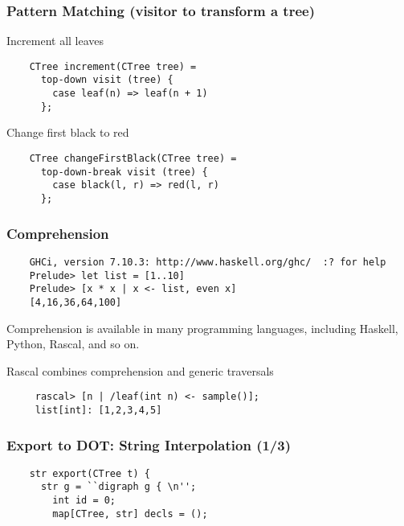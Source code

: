 \documentclass{beamer}
\begin{document}
\begin{frame}[fragile]
  \frametitle{Pattern Matching (visitor to transform a tree)}

  \begin{block}{Increment all leaves}
    \begin{verbatim}
    CTree increment(CTree tree) =
      top-down visit (tree) {
        case leaf(n) => leaf(n + 1)
      };
    \end{verbatim}  
  \end{block}\pause

  \begin{block}{Change first black to red}
    \begin{verbatim}
    CTree changeFirstBlack(CTree tree) =
      top-down-break visit (tree) {
        case black(l, r) => red(l, r)
      };
    \end{verbatim}  
  \end{block}\pause

\end{frame}


\begin{frame}[fragile]
  \frametitle{Comprehension}

  \begin{verbatim}
    GHCi, version 7.10.3: http://www.haskell.org/ghc/  :? for help
    Prelude> let list = [1..10]
    Prelude> [x * x | x <- list, even x]
    [4,16,36,64,100]    
  \end{verbatim}
  
  Comprehension is available in many programming languages\pause,
  including Haskell, Python, Rascal, and so on.

  \begin{block}{Rascal combines comprehension and generic traversals}
   \begin{verbatim}
     rascal> [n | /leaf(int n) <- sample()];
     list[int]: [1,2,3,4,5]
   \end{verbatim}
  \end{block}
  
\end{frame}

\begin{frame}[fragile]
  \frametitle{Export to DOT: String Interpolation (1/3)}

    \begin{verbatim}
    str export(CTree t) {
      str g = ``digraph g { \n'';
        int id = 0;
        map[CTree, str] decls = ();
\end{verbatim}

\end{frame}
\end{document}
